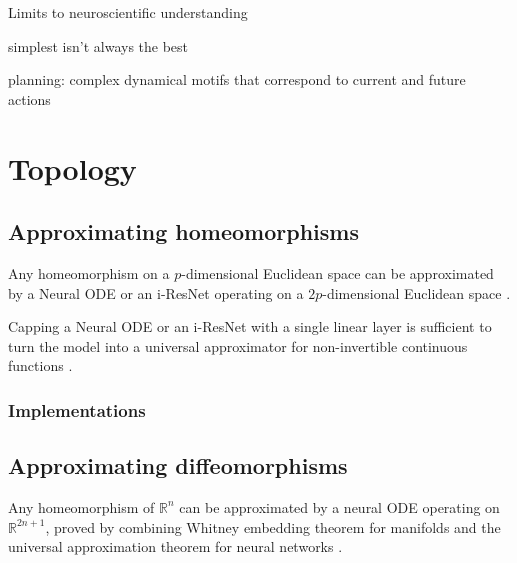 \documentclass{article}
\theoremstyle{definition} \newtheorem{definition}{Definition}  \newtheorem{example}{Example}
\theoremstyle{remark} \newtheorem{remark}{Remark}
\newcounter{ct}
\begin{document}
Limits to neuroscientific understanding \citep{chirimuuta2024brain}


simplest isn't always the best \citep{dyer2023simplest}


planning: complex dynamical motifs that correspond to current and future actions \citep{vyas2020ctd}


\newpage




\newpage
\appendix


\section{Topology}\label{sec:topology}

\subsection{Approximating homeomorphisms}\label{sec:homeomorphisms}


Any homeomorphism on a $p$-dimensional Euclidean space can be approximated by a Neural ODE or an i-ResNet operating on a $2p$-dimensional Euclidean space \citep{zhang2020approximation}.

Capping a Neural ODE or an i-ResNet with a single linear layer is sufficient to turn the model into a universal approximator for non-invertible continuous functions \citep{zhang2020approximation}.

\subsubsection{Implementations}



\subsection{Approximating diffeomorphisms}\label{sec:diffeomorphisms}
Any homeomorphism of $\mathbb {R} ^{n}$ can be approximated by a neural ODE operating on $\mathbb {R} ^{2n+1}$, proved by combining Whitney embedding theorem for manifolds and the universal approximation theorem for neural networks  \citep{zhang2020approximation}.

\end{document}
